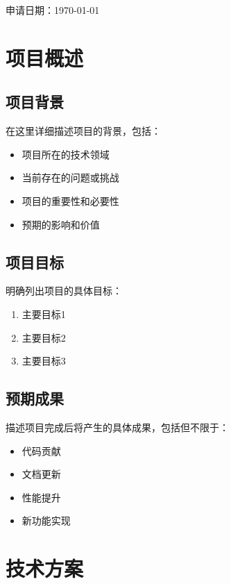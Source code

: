 \documentclass[a4paper,12pt]{article}
\begin{document}
\begin{titlepage}
    \vfill
    
    {\large \textcolor{osppgray}{申请日期：\today}}
    
\end{titlepage}

\tableofcontents
\newpage

\section{项目概述}

\subsection{项目背景}
在这里详细描述项目的背景，包括：
\begin{itemize}
    \item 项目所在的技术领域
    \item 当前存在的问题或挑战
    \item 项目的重要性和必要性
    \item 预期的影响和价值
\end{itemize}

\subsection{项目目标}
明确列出项目的具体目标：
\begin{enumerate}
    \item 主要目标1
    \item 主要目标2
    \item 主要目标3
\end{enumerate}

\subsection{预期成果}
描述项目完成后将产生的具体成果，包括但不限于：
\begin{itemize}
    \item 代码贡献
    \item 文档更新
    \item 性能提升
    \item 新功能实现
\end{itemize}

\section{技术方案}
\end{document}
